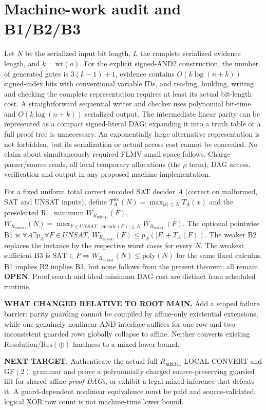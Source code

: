 \documentclass[11pt]{article}
\newcommand{\Rmix}{R_{\mathrm{mix341}}}
\begin{document}
\section*{Machine-work audit and B1/B2/B3}
Let $N$ be the serialized input bit length, $L$ the complete serialized evidence length, and $k=\mathrm{wt}(a)$. For the explicit signed-AND2 construction, the number of generated gates is $3(k-1)+1$, evidence contains $O(k\log(n+k))$ signed-index bits with conventional variable IDs, and reading, building, writing and checking the complete representation requires at least its actual bit-length cost. A straightforward sequential writer and checker uses polynomial bit-time and $O(k\log(n+k))$ serialized output. The intermediate linear parity can be represented as a compact signed-literal DAG; expanding it into a truth table or a full proof tree is unnecessary. An exponentially large alternative representation is not forbidden, but its serialization or actual access cost cannot be concealed. No claim about simultaneously required FLMV small space follows. Charge parser/source reads, all local temporary allocations (the $\rho$ term), DAG access, verification and output in any proposed machine implementation.

For a fixed uniform total correct encoded SAT decider $A$ (correct on malformed, SAT and UNSAT inputs), define $T_A^{wc}(N)=\max_{|x|\le N}T_A(x)$ and the preselected \Rmix{} minimum $W_{\Rmix}(F)$, $\overline W_{\Rmix}(N)=\max_{F\in UNSAT,\ |\mathrm{encode}(F)|\le N}W_{\Rmix}(F)$. The optional pointwise B1 is $\forall A\exists p_A\forall F\in UNSAT,\ W_{\Rmix}(F)\le p_A(|F|+T_A(F))$. The weaker B2 replaces the instance by the respective worst cases for every $N$. The weakest sufficient B3 is $\mathrm{SAT}\in P\Rightarrow\overline W_{\Rmix}(N)\le\mathrm{poly}(N)$ for the same fixed calculus. B1 implies B2 implies B3, but none follows from the present theorem; all remain \textbf{OPEN}. Proof search and ideal minimum DAG cost are distinct from scheduled runtime.

\noindent\textbf{WHAT CHANGED RELATIVE TO ROOT MAIN.} Add a scoped failure barrier: parity guarding cannot be compiled by affine-only existential extensions, while one genuinely nonlinear AND interface suffices for one row and two inconsistent guarded rows globally collapse to affine. Neither converts existing Resolution/$\mathrm{Res}(\oplus)$ hardness to a mixed lower bound.

\noindent\textbf{NEXT TARGET.} Authenticate the actual full $\Rmix$ LOCAL-CONVERT and GF$(2)$ grammar and prove a polynomially charged source-preserving guarded lift for shared affine \emph{proof DAGs}, or exhibit a legal mixed inference that defeats it. A guard-dependent nonlinear equivalence must be paid and source-validated; logical XOR row count is not machine-time lower bound.
\end{document}
